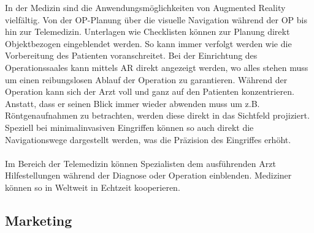 In der Medizin sind die Anwendungsmöglichkeiten von Augmented Reality vielfältig. Von der OP-Planung über die visuelle Navigation während der OP bis hin zur Telemedizin. Unterlagen wie Checklisten können zur Planung direkt Objektbezogen eingeblendet werden. So kann immer verfolgt werden wie die Vorbereitung des Patienten voranschreitet. Bei der Einrichtung des Operationssaales kann mittels AR direkt angezeigt werden, wo alles stehen muss um einen reibungslosen Ablauf der Operation zu garantieren. Während der Operation kann sich der Arzt voll und ganz auf den Patienten konzentrieren. Anstatt, dass er seinen Blick immer wieder abwenden muss um z.B. Röntgenaufnahmen zu betrachten, werden diese direkt in das Sichtfeld projiziert. Speziell bei minimalinvasiven Eingriffen können so auch direkt die Navigationswege dargestellt werden, was die Präzision des Eingriffes erhöht.
\paragraph{}
Im Bereich der Telemedizin können Spezialisten dem ausführenden Arzt Hilfestellungen während der Diagnose oder Operation einblenden. Mediziner können so in Weltweit in Echtzeit kooperieren.

\subsection{Marketing}


